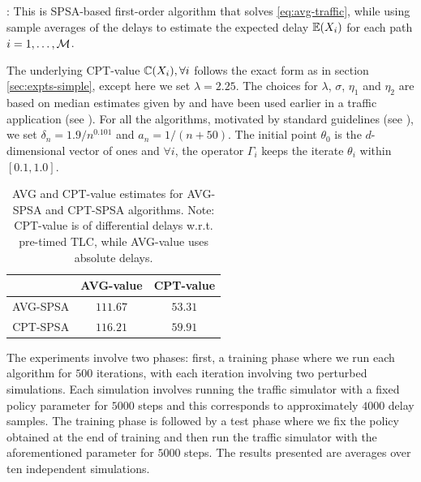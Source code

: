 : This is SPSA-based first-order algorithm that solves \eqref{eq:avg-traffic}, while using sample averages of the delays to estimate the expected delay $\mathbb{E}(X_i)$ for each path $i=1,\ldots,\mathcal{M}$. 

The underlying CPT-value $\mathbb{C}(X_i), \forall i$ follows the exact form as in section \ref{sec:expts-simple}, except here we set $\lambda = 2.25$.
The choices for $\lambda$, $\sigma$, $\eta_1$ and $\eta_2$ are based on median estimates given by \cite{tversky1992advances} and have been used earlier in a traffic application (see \cite{gao2010adaptive}).
For all the algorithms,
 motivated by standard guidelines (see \cite{spall2005introduction}),
 we set $\delta_n = 1.9/n^{0.101}$ and $a_n = 1/(n+50)$. The initial point $\theta_0$ is the $d$-dimensional vector of ones and $\forall i$, the operator $\Gamma_i$ keeps the iterate $\theta_i$ within $[0.1, 1.0]$.

\begin{table}
 \centering
  \caption{AVG and CPT-value estimates for AVG-SPSA and CPT-SPSA algorithms. Note: CPT-value is of differential delays w.r.t. pre-timed TLC, while 
  AVG-value uses absolute delays.}
  \label{tab:cpt-results}
 \begin{tabular}{|c|c|c|}
  \toprule 
   & \textbf{AVG-value}& \textbf{CPT-value }\\\midrule
 AVG-SPSA & $\bm{111.67}$ & $53.31$ \\\midrule
CPT-SPSA & $116.21$ & $\bm{59.91}$\\    \bottomrule
  \end{tabular}
%   
%   
\end{table}


 
The experiments involve two phases:
first, a training phase where we run each algorithm for $500$ iterations, with each iteration involving two perturbed simulations. Each simulation involves running the traffic simulator with a fixed policy parameter for $5000$ steps and this corresponds to approximately $4000$ delay samples. The training phase is followed by a test phase where we fix the policy obtained at the end of training and then run the traffic simulator with the aforementioned parameter for $5000$ steps. The results presented are averages over ten independent simulations.


